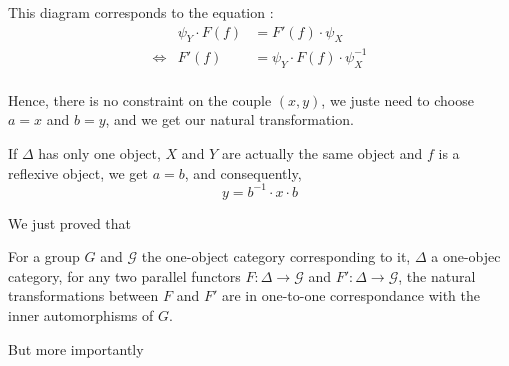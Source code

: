 This diagram corresponds to the equation :
\begin{eqnarray*}
    &\psi_Y\cdot F(f) &=   F'(f) \cdot \psi_X \\
    \Leftrightarrow &
    F'(f) &=   \psi_Y\cdot F(f) \cdot \psi_X^{-1}\\
\end{eqnarray*}

Hence, there is no constraint on the couple $(x,y)$, we juste need to choose $a = x$ and $b = y$, and we get our natural transformation.

If $\Delta$ has only one object, $X$ and $Y$ are actually the same object and $f$ is a reflexive object, we get $a = b$, and consequently,
$$y = b^{-1}\cdot x \cdot b $$

We just proved that
\begin{prop}
    \label{prop:inner-auto}
    For a group $G$ and $\mathcal{G}$ the one-object category corresponding to it, $\Delta$ a one-objec category, for any two parallel functors  $F:\Delta\rightarrow \mathcal{G}$ and $F':\Delta\rightarrow \mathcal{G}$, the natural transformations between $F$ and $F'$ are in one-to-one correspondance with the inner automorphisms of $G$. 
\end{prop}

But more importantly


